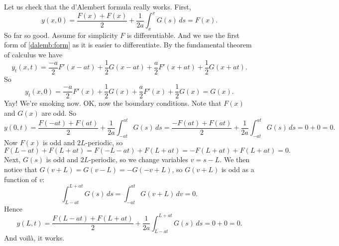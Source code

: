 Let us check that the d'Alembert formula really works.
First,
\begin{equation*}
y(x,0) =
\frac{F(x) + F(x)}{2} + \frac{1}{2a} \int_{x}^{x} G(s) \,ds 
=
F(x) .
\end{equation*}
So far so good.  Assume for simplicity $F$ is differentiable.
And we use the first form of \eqref{dalemb:form} as it is
easier to differentiate.
By the fundamental theorem of calculus we have
\begin{equation*}
y_t(x,t) =
\frac{-a}{2} F'(x-at) + \frac{1}{2} G(x-at)
+
\frac{a}{2} F'(x+at) + \frac{1}{2} G(x+at) .
\end{equation*}
So
\begin{equation*}
y_t(x,0) =
\frac{-a}{2} F'(x) + \frac{1}{2} G(x)
+
\frac{a}{2} F'(x) + \frac{1}{2} G(x) = G(x) .
\end{equation*}
Yay!  We're smoking now.  OK\@, now the boundary conditions.  Note
that $F(x)$ and $G(x)$ are odd.  So
\begin{equation*}
y(0,t) =
\frac{F(-at) + F(at)}{2} + \frac{1}{2a} \int_{-at}^{at} G(s) \,ds 
=
\frac{-F(at) + F(at)}{2} + \frac{1}{2a} \int_{-at}^{at} G(s) \,ds 
= 0 + 0 = 0.
\end{equation*}
Now $F(x)$ is odd and $2L$-periodic, so
\begin{equation*}
F(L-at)+F(L+at)
= 
F(-L-at)+F(L+at)
=
-F(L+at)+F(L+at)
= 0 .
\end{equation*}
Next, $G(s)$ is odd and $2L$-periodic, so we change
variables $v = s-L$.  We then notice that $G(v+L)=G(v-L)=-G(-v+L)$,
so $G(v+L)$ is odd as a function of $v$:
\begin{equation*}
\int_{L-at}^{L+at}
G(s)\,ds
=
\int_{-at}^{at}
G(v+L)\,dv
=
0 .
\end{equation*}
Hence
\begin{equation*}
y(L,t) =
\frac{F(L-at) + F(L+at)}{2} + \frac{1}{2a} \int_{L-at}^{L+at} G(s) \,ds 
=
0 + 0  = 0.
\end{equation*}
And voil\`a, it works.

